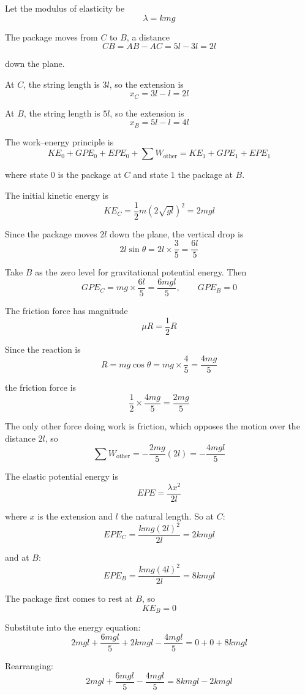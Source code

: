 \documentclass[leqno]{article}
\begin{document}
\begin{enumerate}[
  label=\textbf{\arabic*.},
  leftmargin=*,
  topsep=0pt,
  partopsep=0pt,
  parsep=0pt
]
\begin{djsSolution}
\begin{enumerate}[label=\textbf{(\alph*)}, start=1]
  Let the modulus of elasticity be
  \[
  \lambda = kmg
  \]

  The package moves from $C$ to $B$, a distance
  \[
  CB = AB-AC = 5l-3l = 2l
  \]

  down the plane.

  At $C$, the string length is $3l$, so the extension is
  \[
  x_C = 3l-l=2l
  \]

  At $B$, the string length is $5l$, so the extension is
  \[
  x_B = 5l-l=4l
  \]

  The work--energy principle is
  \[
  KE_0+GPE_0+EPE_0+\sum W_{\text{other}}=KE_1+GPE_1+EPE_1
  \]

  where state \(0\) is the package at \(C\) and state \(1\) the package at \(B\).

  The initial kinetic energy is
  \[
  KE_C = \frac12 m\left(2\sqrt{gl}\right)^2 = 2mgl
  \]

  Since the package moves $2l$ down the plane, the vertical drop is
  \[
  2l\sin\theta = 2l\times\frac35 = \frac{6l}{5}
  \]

  Take \(B\) as the zero level for gravitational potential energy. Then
  \[
  GPE_C = mg\times \frac{6l}{5} = \frac{6mgl}{5},\qquad GPE_B = 0
  \]

  The friction force has magnitude
  \[
  \mu R = \frac12 R
  \]

  Since the reaction is
  \[
  R = mg\cos\theta = mg\times\frac45 = \frac{4mg}{5}
  \]

  the friction force is
  \[
  \frac12 \times \frac{4mg}{5} = \frac{2mg}{5}
  \]

  The only other force doing work is friction, which opposes the motion over the distance $2l$, so
  \[
  \sum W_{\text{other}} = -\frac{2mg}{5}(2l) = -\frac{4mgl}{5}
  \]

  The elastic potential energy is
  \[
  EPE = \frac{\lambda x^2}{2l}
  \]

  where \(x\) is the extension and \(l\) the natural length. So at $C$:
  \[
  EPE_C = \frac{kmg(2l)^2}{2l} = 2kmgl
  \]

  and at $B$:
  \[
  EPE_B = \frac{kmg(4l)^2}{2l} = 8kmgl
  \]

  The package first comes to rest at $B$, so
  \[
  KE_B=0
  \]

  Substitute into the energy equation:
  \[
  2mgl + \frac{6mgl}{5} + 2kmgl - \frac{4mgl}{5} = 0 + 0 + 8kmgl
  \]

  Rearranging:
  \[
  2mgl + \frac{6mgl}{5} - \frac{4mgl}{5} = 8kmgl-2kmgl
  \]


\end{enumerate}
\end{djsSolution}
\end{enumerate}
\end{document}
